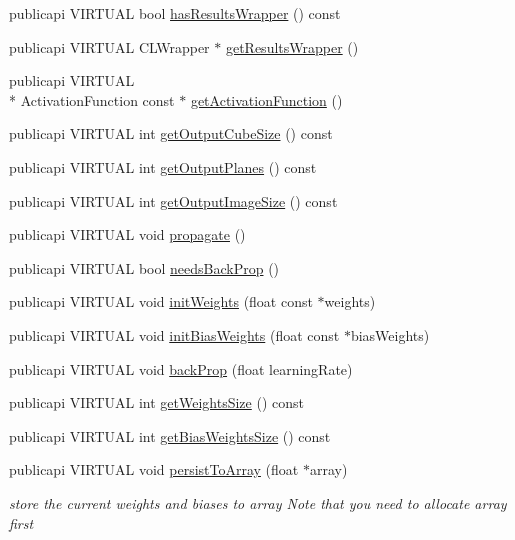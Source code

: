 \begin{DoxyCompactItemize}
\item 
publicapi V\-I\-R\-T\-U\-A\-L bool \hyperlink{classLayer_a6266a51eb760e512987aa8370d5c8c55}{has\-Results\-Wrapper} () const 
\item 
publicapi V\-I\-R\-T\-U\-A\-L C\-L\-Wrapper $\ast$ \hyperlink{classLayer_abe0fe88be13188358312b129deb688ac}{get\-Results\-Wrapper} ()
\item 
publicapi V\-I\-R\-T\-U\-A\-L \\*
Activation\-Function const $\ast$ \hyperlink{classLayer_a0ba9ca126aa2618018823555fb3c9737}{get\-Activation\-Function} ()
\item 
publicapi V\-I\-R\-T\-U\-A\-L int \hyperlink{classLayer_a4d3aab33b1ab977927e7e7358981b572}{get\-Output\-Cube\-Size} () const 
\item 
publicapi V\-I\-R\-T\-U\-A\-L int \hyperlink{classLayer_aca28b88a9ebe40c23fbc72f934980f65}{get\-Output\-Planes} () const 
\item 
publicapi V\-I\-R\-T\-U\-A\-L int \hyperlink{classLayer_ad7ab6a2cb6c247a3f076189b6b66e855}{get\-Output\-Image\-Size} () const 
\item 
publicapi V\-I\-R\-T\-U\-A\-L void \hyperlink{classLayer_a2e03b77adb5127c11f45a3e5927748ad}{propagate} ()
\item 
publicapi V\-I\-R\-T\-U\-A\-L bool \hyperlink{classLayer_a6b870d8f1928d7a054b133a80d5e50d1}{needs\-Back\-Prop} ()
\item 
publicapi V\-I\-R\-T\-U\-A\-L void \hyperlink{classLayer_a582c2a35976d9aaf050a8619c5a630da}{init\-Weights} (float const $\ast$weights)
\item 
publicapi V\-I\-R\-T\-U\-A\-L void \hyperlink{classLayer_acda45ef7133827f399ac682ff409c311}{init\-Bias\-Weights} (float const $\ast$bias\-Weights)
\item 
publicapi V\-I\-R\-T\-U\-A\-L void \hyperlink{classLayer_a74464720a6019ee22eb57c4f876fb812}{back\-Prop} (float learning\-Rate)
\item 
publicapi V\-I\-R\-T\-U\-A\-L int \hyperlink{classLayer_a96234c95cad95b60c44ed0af11b712ba}{get\-Weights\-Size} () const 
\item 
publicapi V\-I\-R\-T\-U\-A\-L int \hyperlink{classLayer_af45c20c2d438d7d17f779e573ba6f784}{get\-Bias\-Weights\-Size} () const 
\item 
publicapi V\-I\-R\-T\-U\-A\-L void \hyperlink{classLayer_a678e0229b3aee66579ba920f11d2c24e}{persist\-To\-Array} (float $\ast$array)
\begin{DoxyCompactList}\small\item\em store the current weights and biases to array Note that you need to allocate array first \end{DoxyCompactList}\item 

\end{DoxyCompactItemize}
